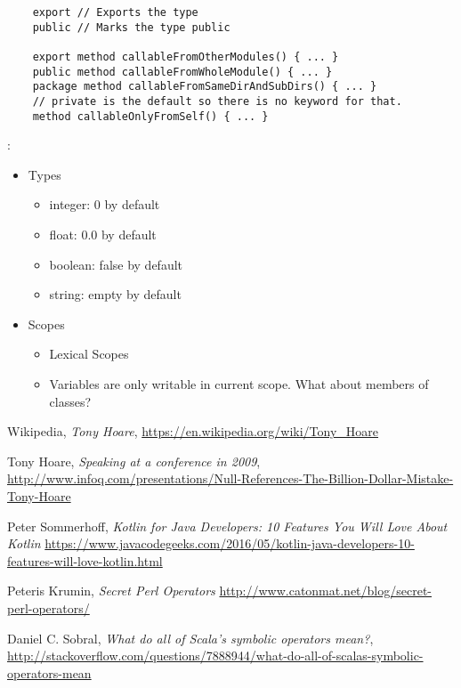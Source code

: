 \documentclass[a4paper,12pt]{article}
\begin{document}
\begin{verbatim}
	export // Exports the type
	public // Marks the type public
	
	export method callableFromOtherModules() { ... }
	public method callableFromWholeModule() { ... }
	package method callableFromSameDirAndSubDirs() { ... }
	// private is the default so there is no keyword for that.
	method callableOnlyFromSelf() { ... }
\end{verbatim}

:

\begin{itemize}
	\item Types
  	\begin{itemize}
  		\item integer: 0 by default
  		\item float: 0.0 by default
  		\item boolean: false by default
  		\item string: empty by default
  	\end{itemize} 
  	\item Scopes
  	\begin{itemize}
  		\item Lexical Scopes
  		\item Variables are only writable in current scope. What about members of classes?
  	\end{itemize}
\end{itemize}

\newpage

\begin{thebibliography}{56}

	Wikipedia,
	\emph{Tony Hoare},
	\url{https://en.wikipedia.org/wiki/Tony_Hoare}
	
	Tony Hoare,
	\emph{Speaking at a conference in 2009},
	\url{http://www.infoq.com/presentations/Null-References-The-Billion-Dollar-Mistake-Tony-Hoare}
	
 	Peter Sommerhoff,
 	\emph{Kotlin for Java Developers: 10 Features You Will Love About Kotlin}
 	\url{https://www.javacodegeeks.com/2016/05/kotlin-java-developers-10-features-will-love-kotlin.html}

	Peteris Krumin,
	\emph{Secret Perl Operators}
	\url{http://www.catonmat.net/blog/secret-perl-operators/}

	Daniel C. Sobral,
	\emph{What do all of Scala's symbolic operators mean?},
	\url{http://stackoverflow.com/questions/7888944/what-do-all-of-scalas-symbolic-operators-mean}

\end{thebibliography}
\end{document}
